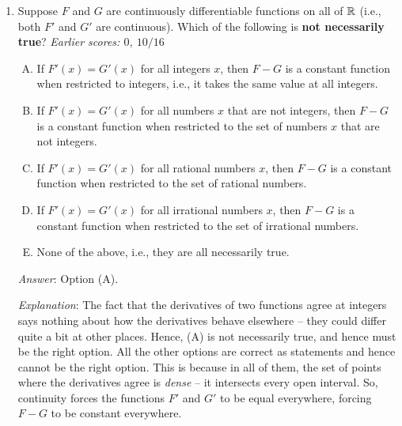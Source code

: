 \documentclass[10pt]{amsart}
\begin{document}
\begin{enumerate}
  {\em Explanation}: There are two open intervals: $(-\infty,0)$ and
  $(0,\infty)$, on which we can look at $F$. On each of these
  intervals, $F(x) = 1/x + $ a constant, but the constant for
  $(-\infty,0)$ may differ from the constant for $(0,\infty)$. Thus,
  we need the initial value information at one positive number and one
  negative number.

  {\em Performance review}: $16$ out of $24$ got this. $8$ chose (D).

  {\em Historical note 1}: $5$ out of $20$ people got this
  correct. $12$ chose (D), $3$ chose (A).

  {\em Historical note 2}: In the last appearance in a 153 quiz, $15$
  out of $28$ people got this correct. $9$ people chose (D), $2$
  people chose (E), and $1$ person each chose (A) and (B).

\item Suppose $F$ and $G$ are continuously differentiable functions on
  all of $\mathbb{R}$ (i.e., both $F'$ and $G'$ are continuous). Which of the
  following is {\bf not necessarily true}? {\em Earlier scores: $0$,
  $10/16$}

  \begin{enumerate}[(A)]
  \item If $F'(x) = G'(x)$ for all integers $x$, then $F - G$ is a
    constant function when restricted to integers, i.e., it takes the
    same value at all integers.
  \item If $F'(x) = G'(x)$ for all numbers $x$ that are not integers,
    then $F - G$ is a constant function when restricted to the set of
    numbers $x$ that are not integers.
  \item If $F'(x) = G'(x)$ for all rational numbers $x$, then $F - G$
    is a constant function when restricted to the set of rational
    numbers.
  \item If $F'(x) = G'(x)$ for all irrational numbers $x$, then $F -
    G$ is a constant function when restricted to the set of irrational
    numbers.
  \item None of the above, i.e., they are all necessarily true.
  \end{enumerate}

  {\em Answer}: Option (A).

  {\em Explanation}: The fact that the derivatives of two functions
  agree at integers says nothing about how the derivatives behave
  elsewhere -- they could differ quite a bit at other places. Hence,
  (A) is not necessarily true, and hence must be the right option. All
  the other options are correct as statements and hence cannot be the
  right option. This is because in all of them, the set of points
  where the derivatives agree is {\em dense} -- it intersects every
  open interval. So, continuity forces the functions $F'$ and $G'$ to
  be equal everywhere, forcing $F - G$ to be constant everywhere.


\end{enumerate}
\end{document}
